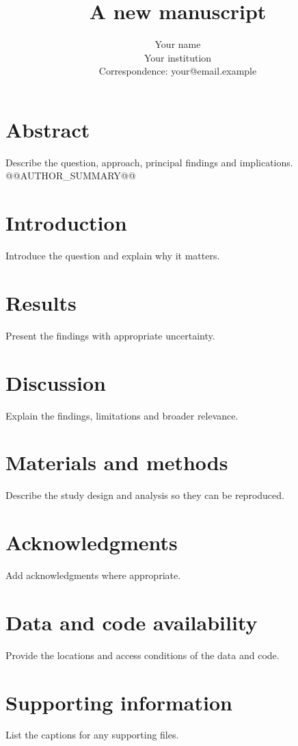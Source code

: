 \documentclass[10pt,letterpaper]{article}
\title{A new manuscript}
\author{Your name\\Your institution\\Correspondence: your@email.example}
\date{}
\begin{document}
\maketitle
\linenumbers
\section*{Abstract}
Describe the question, approach, principal findings and implications.
@@AUTHOR_SUMMARY@@
\section{Introduction}
Introduce the question and explain why it matters.
\section{Results}
Present the findings with appropriate uncertainty.
\section{Discussion}
Explain the findings, limitations and broader relevance.
\section{Materials and methods}
Describe the study design and analysis so they can be reproduced.
\section*{Acknowledgments}
Add acknowledgments where appropriate.
\section*{Data and code availability}
Provide the locations and access conditions of the data and code.
\section*{Supporting information}
List the captions for any supporting files.
% 
% 
\end{document}
